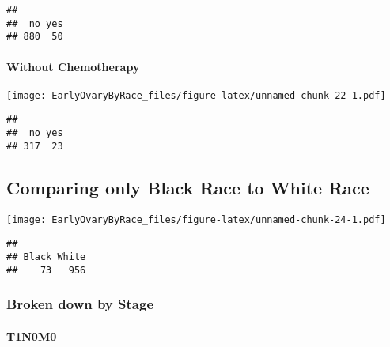\documentclass[
]{article}
\newenvironment{Shaded}{\begin{snugshade}}{\end{snugshade}}
\newcommand{\KeywordTok}[1]{\textcolor[rgb]{0.13,0.29,0.53}{\textbf{#1}}}
\newcommand{\NormalTok}[1]{#1}
\newcommand{\OperatorTok}[1]{\textcolor[rgb]{0.81,0.36,0.00}{\textbf{#1}}}
\begin{document}
\begin{verbatim}
## 
##  no yes 
## 880  50
\end{verbatim}

\hypertarget{without-chemotherapy}{%
\paragraph{Without Chemotherapy}\label{without-chemotherapy}}

\texttt{[image: EarlyOvaryByRace\_files/figure-latex/unnamed-chunk-22-1.pdf]}

\begin{Shaded}
\end{Shaded}

\begin{verbatim}
## 
##  no yes 
## 317  23
\end{verbatim}

\hypertarget{comparing-only-black-race-to-white-race}{%
\subsection{Comparing only Black Race to White
Race}\label{comparing-only-black-race-to-white-race}}

\texttt{[image: EarlyOvaryByRace\_files/figure-latex/unnamed-chunk-24-1.pdf]}

\begin{Shaded}
\end{Shaded}

\begin{verbatim}
## 
## Black White 
##    73   956
\end{verbatim}

\hypertarget{broken-down-by-stage-1}{%
\subsubsection{Broken down by Stage}\label{broken-down-by-stage-1}}

\hypertarget{t1n0m0-1}{%
\paragraph{T1N0M0}\label{t1n0m0-1}}
\end{document}
